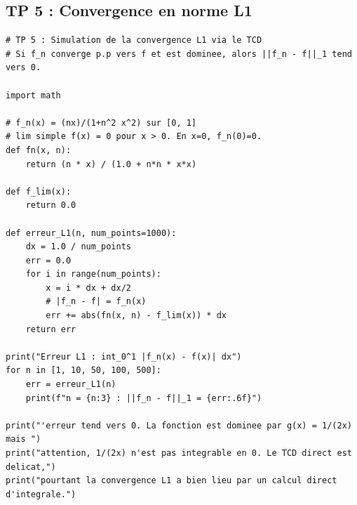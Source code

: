 \documentclass[11pt,a4paper]{article}
\begin{document}
\subsection*{TP 5 : Convergence en norme L1}

\begin{lstlisting}
# TP 5 : Simulation de la convergence L1 via le TCD
# Si f_n converge p.p vers f et est dominee, alors ||f_n - f||_1 tend vers 0.

import math

# f_n(x) = (nx)/(1+n^2 x^2) sur [0, 1]
# lim simple f(x) = 0 pour x > 0. En x=0, f_n(0)=0.
def fn(x, n):
    return (n * x) / (1.0 + n*n * x*x)

def f_lim(x):
    return 0.0

def erreur_L1(n, num_points=1000):
    dx = 1.0 / num_points
    err = 0.0
    for i in range(num_points):
        x = i * dx + dx/2
        # |f_n - f| = f_n(x)
        err += abs(fn(x, n) - f_lim(x)) * dx
    return err

print("Erreur L1 : int_0^1 |f_n(x) - f(x)| dx")
for n in [1, 10, 50, 100, 500]:
    err = erreur_L1(n)
    print(f"n = {n:3} : ||f_n - f||_1 = {err:.6f}")

print("'erreur tend vers 0. La fonction est dominee par g(x) = 1/(2x) mais ")
print("attention, 1/(2x) n'est pas integrable en 0. Le TCD direct est delicat,")
print("pourtant la convergence L1 a bien lieu par un calcul direct d'integrale.")
\end{lstlisting}
\end{document}
